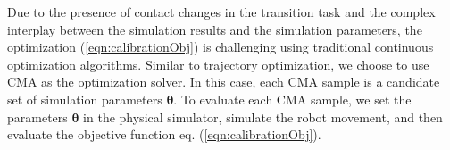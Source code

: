 Due to the presence of contact changes in the transition task and the complex interplay between the simulation results and the simulation parameters, the optimization (\ref{eqn:calibrationObj}) is challenging using traditional continuous optimization algorithms. Similar to trajectory optimization, we choose to use CMA as the optimization solver. In this case, each CMA sample is a candidate set of simulation parameters $\boldsymbol{\theta}$. To evaluate each CMA sample, we set the parameters $\boldsymbol{\theta}$ in the physical simulator, simulate the robot movement, and then evaluate the objective function eq. (\ref{eqn:calibrationObj}).

